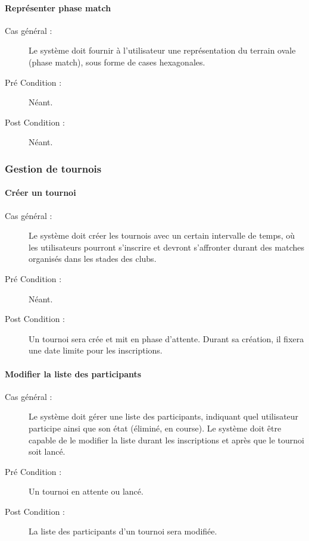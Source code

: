 \documentclass[a4paper]{article}
\begin{document}
\paragraph{Représenter phase match}
\begin{description}
\item[Cas général :] Le système doit fournir à l'\gls{utilisateur} une représentation du terrain ovale (phase match), sous forme de cases hexagonales.
\item[Pré Condition  :] Néant.
\item[Post Condition :] Néant.
\end{description}

\subsubsection{Gestion de tournois}
\paragraph{Créer un tournoi}
\begin{description}
\item[Cas général :] Le système doit créer les tournois avec un certain intervalle de temps, où les \glspl{utilisateur} pourront s'inscrire et devront s'affronter durant des matches organisés dans les stades des \glspl{club}.
\item[Pré Condition  :] Néant.
\item[Post Condition :] Un tournoi sera crée et mit en phase d'attente.
Durant sa création, il fixera une date limite pour les inscriptions.
\end{description}

\paragraph{Modifier la liste des participants}
\begin{description}
\item[Cas général :] Le système doit gérer une liste des participants, indiquant quel \gls{utilisateur} participe ainsi que son état (éliminé, en course). Le système doit être capable de le modifier la liste durant les inscriptions et après que le tournoi soit lancé.
\item[Pré Condition  :] Un tournoi en attente ou lancé.
\item[Post Condition :] La liste des participants d'un tournoi sera modifiée.
\end{description}
\end{document}
